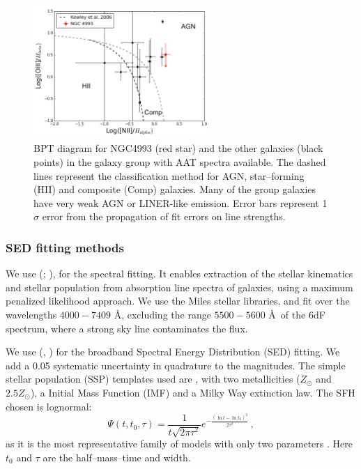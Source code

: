 \begin{figure}
\centering
\includegraphics[width=0.6\textwidth]{./chapters/chapter3/Figures/f3b.pdf}
\caption{BPT diagram for NGC4993 (red star) and the other galaxies (black points) in the galaxy group with AAT spectra available. The dashed lines represent the \citet{2006MNRAS.372..961K} classification method for AGN, star--forming (HII) and composite (Comp) galaxies. Many of the group galaxies have very weak AGN or LINER-like emission. Error bars represent 1$\sigma$ error from the propagation of fit errors on line strengths.}\label{fig:bpt}\end{figure}


\subsubsection{SED fitting methods}
We use \ppxf (\citealt{ppxf}; \citealt{ppxf1}), for the spectral fitting. It enables extraction of the stellar kinematics and stellar population from absorption line spectra of galaxies, using a maximum penalized likelihood approach. We use the Miles stellar libraries, and fit over the wavelengths $4000-7409 $ \AA, excluding the range $5500-5600$ \AA\, of the 6dF spectrum, where a strong sky line contaminates the flux.

We use \lephare (\citealt{arnouts}, \citealt{ilbertlephare}) for the broadband Spectral Energy Distribution (SED) fitting. 
We add a 0.05 systematic uncertainty in quadrature to the magnitudes. 
The simple stellar population (SSP) templates used are \citet{bc03}, with two metallicities ($Z_\odot$ and $2.5Z_\odot$), a \citet{chabrier} Initial Mass Function (IMF) and a Milky Way \citep{allen} extinction law. The SFH chosen is lognormal:
\begin{equation}
  \Psi(t,t_0,\tau)=\frac{1}{t\sqrt{2\pi\tau^2}}e^{-\frac{(\ln t-\ln t_0)^2}{2\tau^2}}\,,  \label{sfr} 
\end{equation}
as it is the most representative family of models with only two parameters \citep{lognorm}. Here $t_0$ and $\tau$ are the half--mass--time and width.

